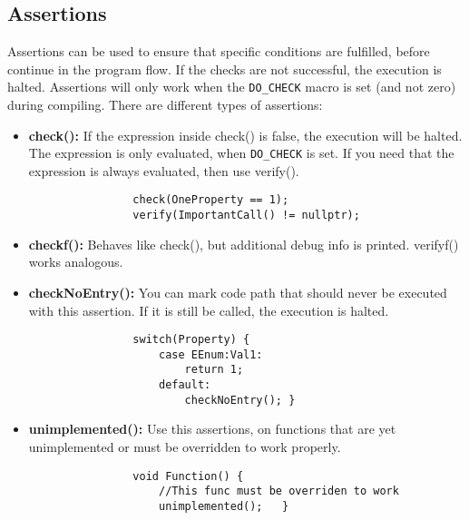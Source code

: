 \documentclass[10pt]{article}
\begin{document}
\begin{multicols*}{5}
	\subsection{Assertions}
	Assertions can be used to ensure that specific conditions are fulfilled, before continue in the program flow. If the checks are not successful, the execution is halted. Assertions will only work when the \verb|DO_CHECK| macro is set (and not zero) during compiling.
	There are different types of assertions:
	\begin{itemize}
		\item \textbf{check():} If the expression inside check() is false, the execution will be halted. The expression is only evaluated, when \verb|DO_CHECK| is set. If you need that the expression is always evaluated, then use verify().
			\begin{verbatim}
				check(OneProperty == 1);
				verify(ImportantCall() != nullptr);
			\end{verbatim}
		\item \textbf{checkf():} Behaves like check(), but additional debug info is printed. verifyf() works analogous.
		\item \textbf{checkNoEntry():} You can mark code path that should never be executed with this assertion. If it is still be called, the execution is halted.
			\begin{verbatim}
				switch(Property) {
				    case EEnum:Val1:
				        return 1;
				    default:
				        checkNoEntry(); }
			\end{verbatim}
		\item \textbf{unimplemented():} Use this assertions, on functions that are yet unimplemented or must be overridden to work properly.
			\begin{verbatim}
				void Function() {
				    //This func must be overriden to work
				    unimplemented();   }
			\end{verbatim}
	\end{itemize}


\end{multicols*}
\end{document}
